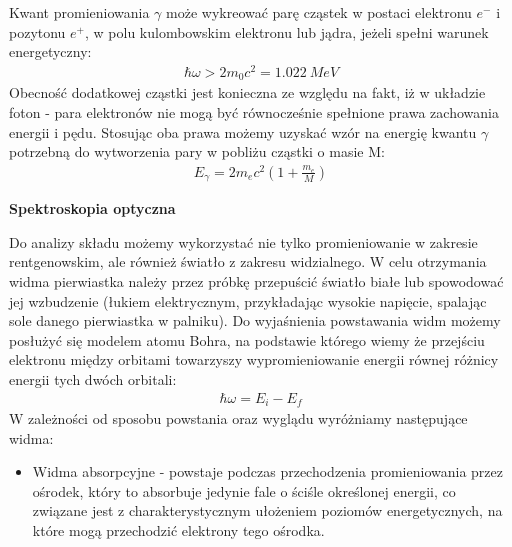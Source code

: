\documentclass{article}
\begin{document}
\begin{enumerate}
Kwant promieniowania $\gamma$ może wykreować parę cząstek w postaci elektronu $e^-$ i pozytonu $e^+$, w polu kulombowskim elektronu lub jądra, jeżeli spełni warunek energetyczny:
 \begin{gather*}
\hbar\omega >2m_0c^2 = 1.022\ MeV
\end{gather*}
Obecność dodatkowej cząstki jest konieczna ze względu na fakt, iż w układzie foton - para elektronów nie mogą być równocześnie  spełnione prawa zachowania energii i pędu. Stosując oba prawa możemy uzyskać wzór na energię kwantu $\gamma$ potrzebną do wytworzenia pary w pobliżu cząstki o masie M:
 \begin{gather*}
E_{\gamma}=2m_ec^2\left ( 1+\frac{m_e}{M} \right )
\end{gather*}
\begin{center}
\end{center}



{\bf Spektroskopia optyczna}

Do analizy składu możemy wykorzystać nie tylko promieniowanie w zakresie rentgenowskim, ale również światło z zakresu widzialnego. W celu otrzymania widma pierwiastka należy przez próbkę przepuścić światło białe lub spowodować jej wzbudzenie (łukiem elektrycznym, przykładając wysokie napięcie, spalając sole danego pierwiastka w palniku). Do wyjaśnienia powstawania widm możemy posłużyć się modelem atomu Bohra, na podstawie którego wiemy  że przejściu elektronu między orbitami towarzyszy wypromieniowanie energii równej różnicy energii tych dwóch orbitali:
\begin{gather*}
\hbar\omega=E_i-E_f
\end{gather*}
W zależności od sposobu powstania oraz wyglądu wyróżniamy następujące widma:
\begin{itemize}
\item Widma absorpcyjne - powstaje podczas przechodzenia promieniowania przez ośrodek, który to absorbuje jedynie  fale o ściśle określonej energii, co związane jest z charakterystycznym ułożeniem poziomów energetycznych, na które mogą  przechodzić elektrony tego ośrodka.


\end{itemize}
\end{enumerate}
\end{document}

